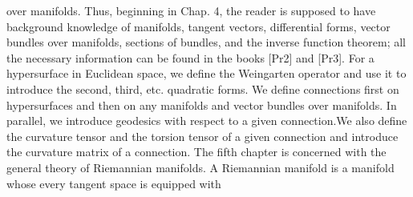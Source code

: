 \documentclass[a4paper,10pt]{article}
\begin{document}
over manifolds. Thus, beginning in Chap. 4, the reader is supposed to have
background knowledge of manifolds, tangent vectors, differential forms, vector
bundles over manifolds, sections of bundles, and the inverse function theorem;
all the necessary information can be found in the books [Pr2] and [Pr3]. For a
hypersurface in Euclidean space, we define the Weingarten operator and use it to
introduce the second, third, etc. quadratic forms. We define connections first on
hypersurfaces and then on any manifolds and vector bundles over manifolds. In
parallel, we introduce geodesics with respect to a given connection.We also define
the curvature tensor and the torsion tensor of a given connection and introduce the
curvature matrix of a connection.
The fifth chapter is concerned with the general theory of Riemannian manifolds.
A Riemannian manifold is a manifold whose every tangent space is equipped with
\end{document}
